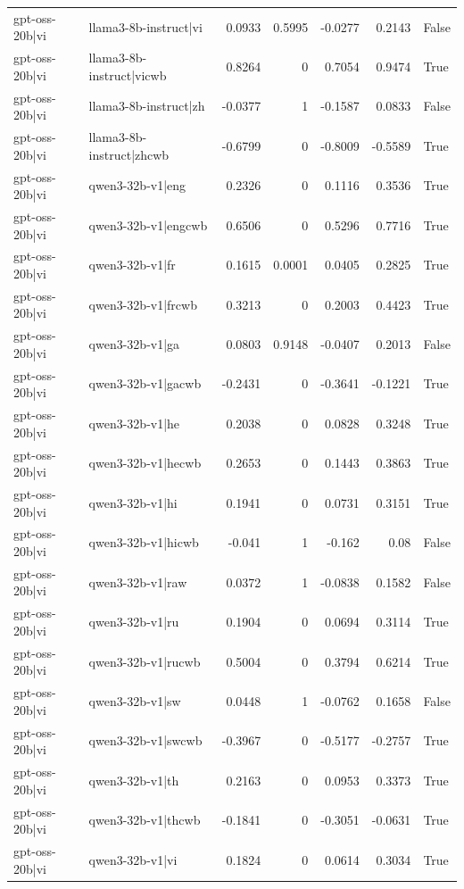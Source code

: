 \begin{table}
\begin{tabular}{l l r r r r l}
gpt-oss-20b|vi & llama3-8b-instruct|vi & 0.0933 & 0.5995 & -0.0277 & 0.2143 & False \\
gpt-oss-20b|vi & llama3-8b-instruct|vicwb & 0.8264 & 0 & 0.7054 & 0.9474 & True \\
gpt-oss-20b|vi & llama3-8b-instruct|zh & -0.0377 & 1 & -0.1587 & 0.0833 & False \\
gpt-oss-20b|vi & llama3-8b-instruct|zhcwb & -0.6799 & 0 & -0.8009 & -0.5589 & True \\
gpt-oss-20b|vi & qwen3-32b-v1|eng & 0.2326 & 0 & 0.1116 & 0.3536 & True \\
gpt-oss-20b|vi & qwen3-32b-v1|engcwb & 0.6506 & 0 & 0.5296 & 0.7716 & True \\
gpt-oss-20b|vi & qwen3-32b-v1|fr & 0.1615 & 0.0001 & 0.0405 & 0.2825 & True \\
gpt-oss-20b|vi & qwen3-32b-v1|frcwb & 0.3213 & 0 & 0.2003 & 0.4423 & True \\
gpt-oss-20b|vi & qwen3-32b-v1|ga & 0.0803 & 0.9148 & -0.0407 & 0.2013 & False \\
gpt-oss-20b|vi & qwen3-32b-v1|gacwb & -0.2431 & 0 & -0.3641 & -0.1221 & True \\
gpt-oss-20b|vi & qwen3-32b-v1|he & 0.2038 & 0 & 0.0828 & 0.3248 & True \\
gpt-oss-20b|vi & qwen3-32b-v1|hecwb & 0.2653 & 0 & 0.1443 & 0.3863 & True \\
gpt-oss-20b|vi & qwen3-32b-v1|hi & 0.1941 & 0 & 0.0731 & 0.3151 & True \\
gpt-oss-20b|vi & qwen3-32b-v1|hicwb & -0.041 & 1 & -0.162 & 0.08 & False \\
gpt-oss-20b|vi & qwen3-32b-v1|raw & 0.0372 & 1 & -0.0838 & 0.1582 & False \\
gpt-oss-20b|vi & qwen3-32b-v1|ru & 0.1904 & 0 & 0.0694 & 0.3114 & True \\
gpt-oss-20b|vi & qwen3-32b-v1|rucwb & 0.5004 & 0 & 0.3794 & 0.6214 & True \\
gpt-oss-20b|vi & qwen3-32b-v1|sw & 0.0448 & 1 & -0.0762 & 0.1658 & False \\
gpt-oss-20b|vi & qwen3-32b-v1|swcwb & -0.3967 & 0 & -0.5177 & -0.2757 & True \\
gpt-oss-20b|vi & qwen3-32b-v1|th & 0.2163 & 0 & 0.0953 & 0.3373 & True \\
gpt-oss-20b|vi & qwen3-32b-v1|thcwb & -0.1841 & 0 & -0.3051 & -0.0631 & True \\
gpt-oss-20b|vi & qwen3-32b-v1|vi & 0.1824 & 0 & 0.0614 & 0.3034 & True \\

\end{tabular}
\end{table}
